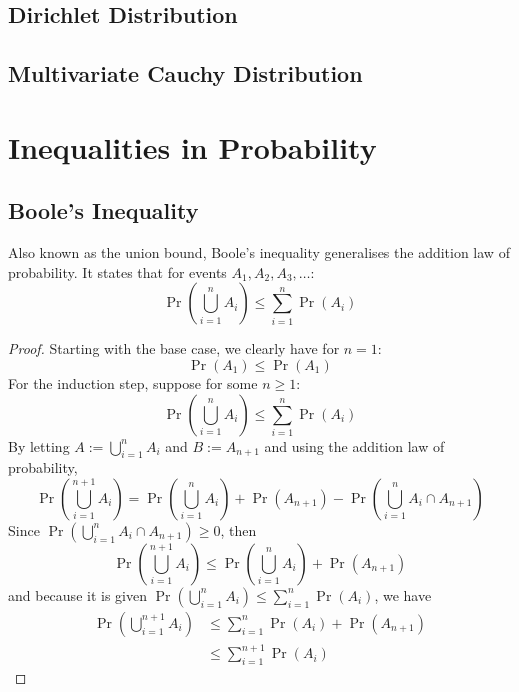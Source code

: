 \documentclass[11pt]{report} %
\begin{document}
\subsection{Dirichlet Distribution}

\subsection{Multivariate Cauchy Distribution} 

\section{Inequalities in Probability}

\subsection{Boole's Inequality}

Also known as the union bound, Boole's inequality generalises the addition law of probability. It states that for events $A_{1}, A_{2}, A_{3}, \dots$:
\begin{equation}
\operatorname{Pr}\left(\bigcup_{i = 1}^{n}A_{i}\right) \leq \sum_{i = 1}^{n}\operatorname{Pr}\left(A_{i}\right)
\end{equation}
\begin{proof}
Starting with the base case, we clearly have for $n = 1$:
\begin{equation}
\operatorname{Pr}\left(A_{1}\right) \leq \operatorname{Pr}\left(A_{1}\right)
\end{equation}
For the induction step, suppose for some $n \geq 1$:
\begin{equation}
\operatorname{Pr}\left(\bigcup_{i = 1}^{n}A_{i}\right) \leq \sum_{i = 1}^{n}\operatorname{Pr}\left(A_{i}\right)
\end{equation}
By letting $A := \bigcup_{i = 1}^{n}A_{i}$ and $B := A_{n + 1}$ and using the addition law of probability,
\begin{equation}
\operatorname{Pr}\left(\bigcup_{i = 1}^{n + 1}A_{i}\right) = \operatorname{Pr}\left(\bigcup_{i = 1}^{n}A_{i}\right) + \operatorname{Pr}\left(A_{n + 1}\right) -  \operatorname{Pr}\left(\bigcup_{i = 1}^{n}A_{i} \cap A_{n + 1}\right)
\end{equation}
Since $\operatorname{Pr}\left(\bigcup_{i = 1}^{n}A_{i} \cap A_{n + 1}\right) \geq 0$, then
\begin{equation}
\operatorname{Pr}\left(\bigcup_{i = 1}^{n + 1}A_{i}\right) \leq \operatorname{Pr}\left(\bigcup_{i = 1}^{n}A_{i}\right) + \operatorname{Pr}\left(A_{n + 1}\right)
\end{equation}
and because it is given $\operatorname{Pr}\left(\bigcup_{i = 1}^{n}A_{i}\right) \leq \sum_{i = 1}^{n}\operatorname{Pr}\left(A_{i}\right)$, we have
\begin{align}
\operatorname{Pr}\left(\bigcup_{i = 1}^{n + 1}A_{i}\right) &\leq \sum_{i = 1}^{n}\operatorname{Pr}\left(A_{i}\right) + \operatorname{Pr}\left(A_{n + 1}\right) \\
&\leq \sum_{i = 1}^{n + 1}\operatorname{Pr}\left(A_{i}\right)
\end{align}
\end{proof}
\end{document}

